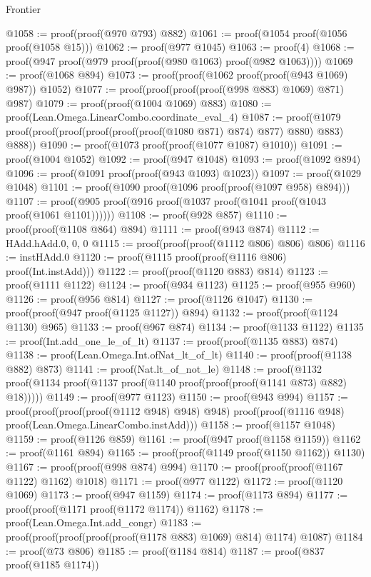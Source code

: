 \begin{lexlean}{Frontier}
\begin{coremodule}
@1058 := proof(proof(@970 @793) @882)
@1061 := proof(@1054 proof(@1056 proof(@1058 @15)))
@1062 := proof(@977 @1045)
@1063 := proof(4)
@1068 := proof(@947 proof(@979 proof(proof(@980 @1063) proof(@982 @1063))))
@1069 := proof(@1068 @894)
@1073 := proof(proof(@1062 proof(proof(@943 @1069) @987)) @1052)
@1077 := proof(proof(proof(proof(@998 @883) @1069) @871) @987)
@1079 := proof(proof(@1004 @1069) @883)
@1080 := proof(Lean.Omega.LinearCombo.coordinate_eval_4)
@1087 := proof(@1079 proof(proof(proof(proof(proof(proof(@1080 @871) @874) @877) @880) @883) @888))
@1090 := proof(@1073 proof(proof(@1077 @1087) @1010))
@1091 := proof(@1004 @1052)
@1092 := proof(@947 @1048)
@1093 := proof(@1092 @894)
@1096 := proof(@1091 proof(proof(@943 @1093) @1023))
@1097 := proof(@1029 @1048)
@1101 := proof(@1090 proof(@1096 proof(proof(@1097 @958) @894)))
@1107 := proof(@905 proof(@916 proof(@1037 proof(@1041 proof(@1043 proof(@1061 @1101))))))
@1108 := proof(@928 @857)
@1110 := proof(proof(@1108 @864) @894)
@1111 := proof(@943 @874)
@1112 := HAdd.hAdd.{0, 0, 0}
@1115 := proof(proof(proof(@1112 @806) @806) @806)
@1116 := instHAdd.{0}
@1120 := proof(@1115 proof(proof(@1116 @806) proof(Int.instAdd)))
@1122 := proof(proof(@1120 @883) @814)
@1123 := proof(@1111 @1122)
@1124 := proof(@934 @1123)
@1125 := proof(@955 @960)
@1126 := proof(@956 @814)
@1127 := proof(@1126 @1047)
@1130 := proof(proof(@947 proof(@1125 @1127)) @894)
@1132 := proof(proof(@1124 @1130) @965)
@1133 := proof(@967 @874)
@1134 := proof(@1133 @1122)
@1135 := proof(Int.add_one_le_of_lt)
@1137 := proof(proof(@1135 @883) @874)
@1138 := proof(Lean.Omega.Int.ofNat_lt_of_lt)
@1140 := proof(proof(@1138 @882) @873)
@1141 := proof(Nat.lt_of_not_le)
@1148 := proof(@1132
      proof(@1134 proof(@1137 proof(@1140 proof(proof(proof(@1141 @873) @882) @18)))))
@1149 := proof(@977 @1123)
@1150 := proof(@943 @994)
@1157 := proof(proof(proof(proof(@1112 @948) @948) @948)
      proof(proof(@1116 @948) proof(Lean.Omega.LinearCombo.instAdd)))
@1158 := proof(@1157 @1048)
@1159 := proof(@1126 @859)
@1161 := proof(@947 proof(@1158 @1159))
@1162 := proof(@1161 @894)
@1165 := proof(proof(@1149 proof(@1150 @1162)) @1130)
@1167 := proof(proof(@998 @874) @994)
@1170 := proof(proof(proof(@1167 @1122) @1162) @1018)
@1171 := proof(@977 @1122)
@1172 := proof(@1120 @1069)
@1173 := proof(@947 @1159)
@1174 := proof(@1173 @894)
@1177 := proof(proof(@1171 proof(@1172 @1174)) @1162)
@1178 := proof(Lean.Omega.Int.add_congr)
@1183 := proof(proof(proof(proof(proof(@1178 @883) @1069) @814) @1174) @1087)
@1184 := proof(@73 @806)
@1185 := proof(@1184 @814)
@1187 := proof(@837 proof(@1185 @1174))

\end{coremodule}
\end{lexlean}
